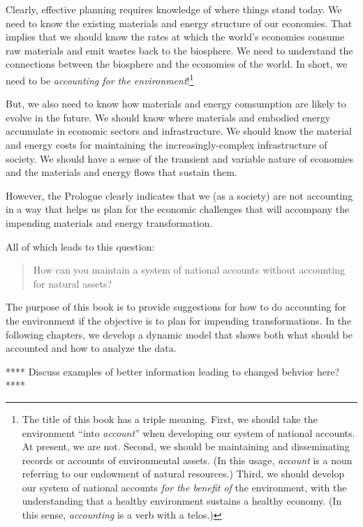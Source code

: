 Clearly, effective planning requires knowledge of where things stand today.
We need to know the existing materials and energy structure of our economies. 
That implies that we should know the rates at which 
the world's economies consume raw materials and emit wastes back to the biosphere.
We need to understand the connections between the biosphere and the economies of the world.
In short, we need to be \emph{accounting for the environment}!\footnote{The title 
	of this book has a triple meaning.
	First, we should take the environment ``into \emph{account}''
		when developing our system of national accounts.
		At present, we are not.
	Second, we should be maintaining and disseminating
		records or accounts of environmental assets. 
		(In this usage, \emph{account} is a noun
		referring to our endowment of natural resources.)
	Third, we should develop our system of national accounts 
		\emph{for the benefit of} the environment, 
		with the understanding 
		that a healthy environment sustains a healthy economy.
		(In this sense, \emph{accounting} is a verb with a telos.)
}

But, we also need to know how materials and energy comsumption 
are likely to evolve in the future.
We should know where materials and embodied energy accumulate 
in economic sectors and infrastructure. 
We should know the material and energy costs for maintaining the
increasingly-complex infrastructure of society.
We should have a sense of the transient and variable nature of economies
and the materials and energy flows that sustain them.

However, the Prologue clearly indicates that we (as a society) 
are not accounting in a way that helps us plan 
for the economic challenges that will accompany 
the impending materials and energy transformation.

All of which leads to this question:

\begin{quote}
	How can you maintain a system of national accounts without accounting for natural assets?
\end{quote}

The purpose of this book is to provide suggestions 
for how to do accounting for the environment 
if the objective is to plan for impending transformations.
In the following chapters, we develop
a dynamic model that shows both what should be accounted and 
how to analyze the data.

**** Discuss examples of better information leading to changed behvior here? ****


